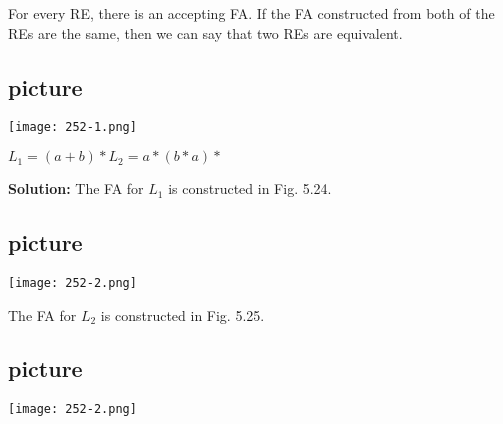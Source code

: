\documentclass{article}
\begin{document}
\vspace*{0.1cm}
\small{ For every RE, there is an accepting FA. If the FA constructed from both of the REs are the same, then
we can say that two REs are equivalent.}\\

\begin{flushleft}
  \section{picture}
\texttt{[image: 252-1.png]}
\end{flushleft}

\begin{center}
$L_1 = (a + b)* L_2 = a*(b*a)*$\\
\end{center}

\textbf{Solution:} The FA for $L_1$ is constructed in Fig. 5.24.\\
\begin{center}
\section{picture}
\texttt{[image: 252-2.png]}
\end{center}

The FA for $L_2$ is constructed in Fig. 5.25.\\
\begin{center}
\section{picture}
\texttt{[image: 252-2.png]}
\end{center}
\end{document}
